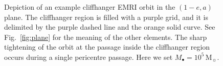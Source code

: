 \documentclass[desactivate]{aa}
\begin{document}
        \begin{figure}
            \centering
            \caption{Depiction of an example cliffhanger EMRI orbit in the $(1-e,a)$ plane. The cliffhanger region is filled with a purple grid, and it is delimited by the purple dashed line and the orange solid curve. See Fig.\ \ref{fig:plane} for the meaning of the other elements. The sharp tightening of the orbit at the passage inside the cliffhanger region occurs during a single pericentre passage. Here we set $M_\bullet = 10^5 \, \mathrm{M}_\sun$.}
            \label{fig:cliff}
        \end{figure}
\end{document}
